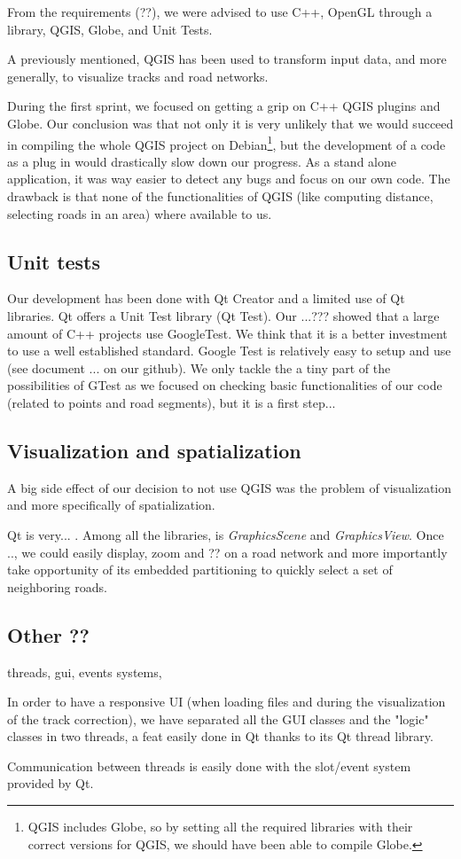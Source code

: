 From the requirements (??), we were advised to use C++, OpenGL through a library, QGIS, Globe, and Unit Tests.

A previously mentioned, QGIS has been used to transform input data, and more generally, to visualize tracks and road networks. 

During the first sprint, we focused on getting a grip on C++ QGIS plugins and Globe. Our conclusion was that not only it is very unlikely that we would succeed in compiling the whole QGIS project on Debian\footnote{QGIS includes Globe, so by setting all the required libraries with their correct versions for QGIS, we should have been able to compile Globe.}, but the development of a code as a plug in would drastically slow down our progress. As a stand alone application, it was way easier to detect any bugs and focus on our own code. The drawback is that none of the functionalities of QGIS (like computing distance, selecting roads in an area) where available to us. 

\subsection{Unit tests}

Our development has been done with Qt Creator and a limited use of Qt libraries. Qt offers a Unit Test library (Qt Test). Our ...??? showed that a large amount of C++ projects use GoogleTest. We think that it is a better investment to use a well established standard. 
Google Test is relatively easy to setup and use (see document ... on our github). We only tackle the a tiny part of the possibilities of GTest as we focused on checking basic functionalities of our code (related to points and road segments), but it is a first step... 

\subsection{Visualization and spatialization}

A big side effect of our decision to not use QGIS was the problem of visualization and more specifically of spatialization.

Qt is very... . Among all the libraries, is \textit{GraphicsScene} and \textit{GraphicsView}. Once .., we could easily display, zoom and ?? on a road network and more importantly take opportunity of its embedded partitioning to quickly select a set of neighboring roads.

\subsection{Other ??}
threads, gui, events systems, 

In order to have a responsive UI (when loading files and during the visualization of the track correction), we have separated all the GUI classes and the "logic" classes in two threads, a feat easily done in Qt thanks to its Qt thread library.

Communication between threads is easily done with the slot/event system provided by Qt.



